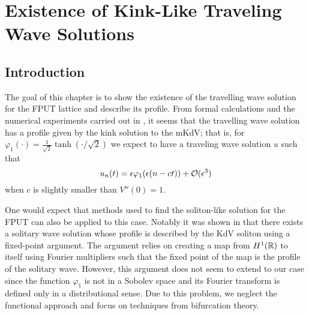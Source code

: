 \chapter{Existence of Kink-Like Traveling Wave Solutions}
\label{chp:existence}
\pagestyle{myheadings}

\section{Introduction}
The goal of this chapter is to show the existence of the travelling wave solution for the FPUT lattice and describe its profile. From formal calculations and the numerical experiments carried out in \cite{pace2019beta}, it seems that the travelling wave solution has a profile given by the kink solution to the mKdV; that is, for \(\varphi_1(\cdot) = \frac 1 {\sqrt 2} \tanh(\cdot/\sqrt 2)\) we expect to have a traveling wave solution \(u\) such that 
\begin{equation}\label{formal-approximation}
	u_n(t) = \epsilon \varphi_1(\epsilon(n - ct)) +\mathcal{O}(\epsilon^3)
\end{equation}
when \(c\) is slightly smaller than \(V''(0) = 1\).

One would expect that methods used to find the soliton-like solution for the FPUT can also be applied to this case. Notably it was shown in \cite{friesecke1999solitary} that there exists a solitary wave solution whose profile is described by the KdV soliton using a fixed-point argument. The argument relies on creating a map from \(H^1(\mathbb{R})\) to itself using Fourier multipliers such that the fixed point of the map is the profile of the solitary wave. However, this argument does not seem to extend to our case since the function \(\varphi_1\) is not in a Sobolev space and its Fourier transform is defined only in a distributional sense. Due to this problem, we neglect the functional approach and focus on techniques from bifurcation theory. 


